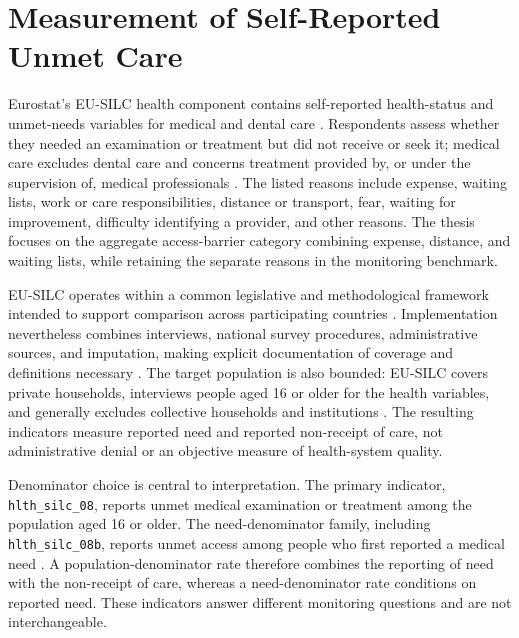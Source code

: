\section{Measurement of Self-Reported Unmet Care}

Eurostat's EU-SILC health component contains self-reported health-status and unmet-needs variables for medical and dental care \citep{eurostat_health_variables_metadata}. Respondents assess whether they needed an examination or treatment but did not receive or seek it; medical care excludes dental care and concerns treatment provided by, or under the supervision of, medical professionals \citep{eurostat_health_variables_silc_methodology}. The listed reasons include expense, waiting lists, work or care responsibilities, distance or transport, fear, waiting for improvement, difficulty identifying a provider, and other reasons. The thesis focuses on the aggregate access-barrier category combining expense, distance, and waiting lists, while retaining the separate reasons in the monitoring benchmark.

EU-SILC operates within a common legislative and methodological framework intended to support comparison across participating countries \citep{eurostat_eusilc_methodology}. Implementation nevertheless combines interviews, national survey procedures, administrative sources, and imputation, making explicit documentation of coverage and definitions necessary \citep{eurostat_silc_information_data}. The target population is also bounded: EU-SILC covers private households, interviews people aged 16 or older for the health variables, and generally excludes collective households and institutions \citep{eurostat_silc_information_data,eurostat_income_living_metadata}. The resulting indicators measure reported need and reported non-receipt of care, not administrative denial or an objective measure of health-system quality.

Denominator choice is central to interpretation. The primary indicator, \texttt{hlth\_silc\_08}, reports unmet medical examination or treatment among the population aged 16 or older. The need-denominator family, including \texttt{hlth\_silc\_08b}, reports unmet access among people who first reported a medical need \citep{eurostat_unmet_needs_statistics,eurostat_health_variables_metadata}. A population-denominator rate therefore combines the reporting of need with the non-receipt of care, whereas a need-denominator rate conditions on reported need. These indicators answer different monitoring questions and are not interchangeable.

